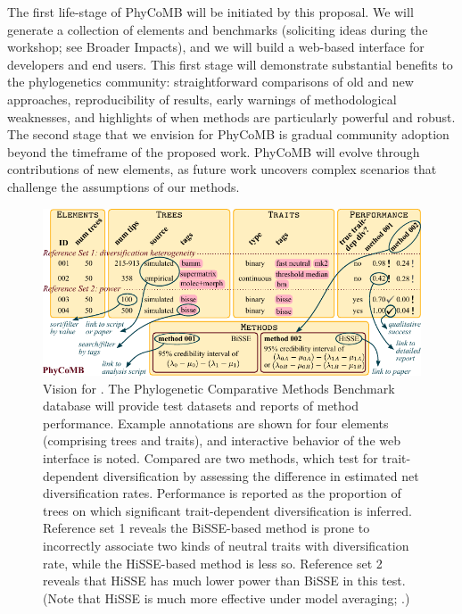 The first life-stage of PhyCoMB will be initiated by this proposal.
We will generate a collection of elements and benchmarks (soliciting ideas during the workshop; see Broader Impacts), and we will build a web-based interface for developers and end users.
This first stage will demonstrate substantial benefits to the phylogenetics community: straightforward comparisons of old and new approaches, reproducibility of results, early warnings of methodological weaknesses, and highlights of when methods are particularly powerful and robust. %
%
The second stage that we envision for PhyCoMB is gradual community adoption beyond the timeframe of the proposed work.
PhyCoMB will evolve through contributions of new elements, as future work uncovers complex scenarios that challenge the assumptions of our methods.

\begin{figure}
\includegraphics[width=\textwidth]{images/proposed}
\caption{
Vision for \phycomb.
The Phylogenetic Comparative Methods Benchmark database will provide test datasets and reports of method performance.
Example annotations are shown for four elements (comprising trees and traits), and interactive behavior of the web interface is noted.
Compared are two methods, which test for trait-dependent diversification by assessing the difference in estimated net diversification rates.
Performance is reported as the proportion of trees on which significant trait-dependent diversification is inferred.
Reference set 1 reveals the BiSSE-based method is prone to incorrectly associate two kinds of neutral traits with diversification rate, while the HiSSE-based method is less so.
Reference set 2 reveals that HiSSE has much lower power than BiSSE in this test.
(Note that HiSSE is much more effective under model averaging; \citealt{beaulieu2016}.)
}
\label{fig:proposal_phycomb}
\end{figure}

